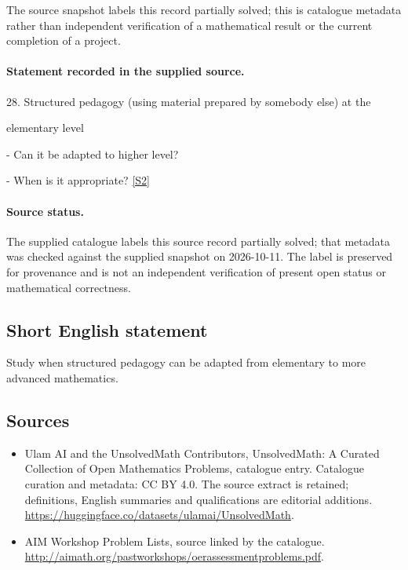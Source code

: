 \documentclass[11pt]{article}
\begin{document}
The source snapshot labels this record partially solved; this is catalogue metadata rather than independent verification of a mathematical result or the current completion of a project.
\paragraph{Statement recorded in the supplied source.}
28. Structured pedagogy (using material prepared by somebody else) at the

elementary level

- Can it be adapted to higher level?

- When is it appropriate? \href{http://aimath.org/pastworkshops/oerassessmentproblems.pdf}{[S2]}
\paragraph{Source status.}
The supplied catalogue labels this source record partially solved; that metadata was checked against the supplied snapshot on 2026-10-11. The label is preserved for provenance and is not an independent verification of present open status or mathematical correctness.
\subsection{Short English statement}
Study when structured pedagogy can be adapted from elementary to more advanced mathematics.
\subsection{Sources}
\begin{itemize}
\item[S1] Ulam AI and the UnsolvedMath Contributors, UnsolvedMath: A Curated Collection of Open Mathematics Problems, catalogue entry. Catalogue curation and metadata: CC BY 4.0. The source extract is retained; definitions, English summaries and qualifications are editorial additions.
\url{https://huggingface.co/datasets/ulamai/UnsolvedMath}.
\item[S2] AIM Workshop Problem Lists, source linked by the catalogue.
\url{http://aimath.org/pastworkshops/oerassessmentproblems.pdf}.
\end{itemize}
\end{document}
